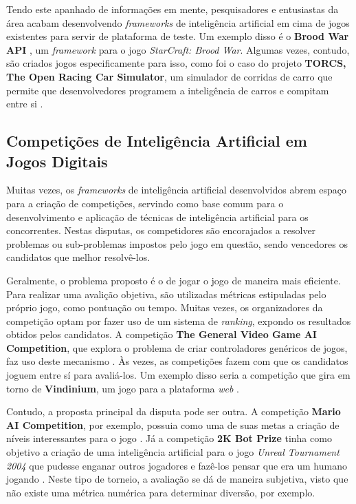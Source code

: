 Tendo este apanhado de informações em mente, pesquisadores e entusiastas da área
acabam desenvolvendo \textit{frameworks} de inteligência artificial em cima de
jogos existentes para servir de plataforma de teste. Um exemplo disso é o
\textbf{Brood War API} \cite{BWAPI}, um \textit{framework} para o jogo
\textit{StarCraft: Brood War}. Algumas vezes, contudo, são criados jogos
especificamente para isso, como foi o caso do projeto \textbf{TORCS, The Open
Racing Car Simulator}, um simulador de corridas de carro que permite que
desenvolvedores programem a inteligência de carros e compitam entre si
\cite{TORCSWEB}.

\subsection{Competições de Inteligência Artificial em Jogos Digitais}
Muitas vezes, os \textit{frameworks} de inteligência artificial desenvolvidos
abrem espaço para a criação de competições, servindo como base comum para o
desenvolvimento e aplicação de técnicas de inteligência artificial para os
concorrentes. Nestas disputas, os competidores são encorajados a resolver
problemas ou sub-problemas impostos pelo jogo em questão, sendo vencedores os
candidatos que melhor resolvê-los.

Geralmente, o problema proposto é o de jogar o jogo de maneira mais eficiente.
Para realizar uma avalição objetiva, são utilizadas métricas estipuladas pelo
próprio jogo, como pontuação ou tempo. Muitas vezes, os organizadores da
competição optam por fazer uso de um sistema de \textit{ranking}, expondo os
resultados obtidos pelos candidatos. A competição \textbf{The General Video Game
AI Competition}, que explora o problema de criar controladores genéricos de
jogos, faz uso deste mecanismo \cite{GVGAIWEB}.  Às vezes, as competições fazem
com que os candidatos joguem entre sí para avaliá-los.  Um exemplo disso seria a
competição que gira em torno de \textbf{Vindinium}, um jogo para a plataforma
\textit{web} \cite{VINDINIUMWEB}.

Contudo, a proposta principal da disputa pode ser outra. A competição
\textbf{Mario AI Competition}, por exemplo, possuia como uma de suas metas a
criação de níveis interessantes para o jogo \cite{MARIOAIWEB}. Já a competição
\textbf{2K Bot Prize} tinha como objetivo a criação de uma inteligência
artificial para o jogo \textit{Unreal Tournament 2004} que pudesse enganar
outros jogadores e fazê-los pensar que era um humano jogando
\cite{UNREALAIWEB}. Neste tipo de torneio, a avaliação se dá de maneira
subjetiva, visto que não existe uma métrica numérica para determinar diversão,
por exemplo.

